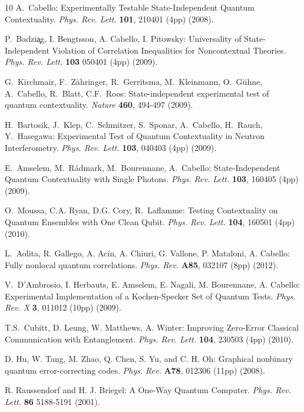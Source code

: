 \begin{thebibliography}{10}
A.~Cabello: Experimentally Testable State-Independent Quantum Contextuality. {\it Phys. Rev. Lett.} \textbf{{\bf 101}}, 210401 (4pp) (2008).

P.~Badzi{\c a}g, I. Bengtsson, A. Cabello, I. Pitowsky: Universality of State-Independent Violation of Correlation Inequalities for Noncontextual Theories. {\it  Phys. Rev. Lett.} {\bf 103} 050401 (4pp) (2009).

G.~Kirchmair, F.~Z{\"a}hringer, R.~Gerritsma, M.~Kleinmann, O.~G{\"u}hne, A.~Cabello, R.~Blatt, C.F.~Roos: State-independent experimental test of quantum contextuality. {\it Nature} \textbf{{\bf 460}}, 494-497 (2009).

H.~Bartosik, J.~Klep, C.~Schmitzer, S.~Sponar, A.~Cabello, H.~Rauch, Y.~Hasegawa: Experimental Test of Quantum Contextuality in Neutron Interferometry. {\it Phys. Rev. Lett.} \textbf{{\bf 103}}, 040403 (4pp) (2009).

E.~Amselem, M.~R{\aa}dmark, M.~Bourennane, A.~Cabello: State-Independent Quantum Contextuality with Single Photons. {\it Phys. Rev. Lett.} \textbf{{\bf 103}}, 160405 (4pp) (2009).

O.~Moussa, C.A. Ryan, D.G. Cory, R.~Laflamme: Testing Contextuality on Quantum Ensembles with One Clean Qubit. {\it Phys. Rev. Lett.} \textbf{{\bf 104}}, 160501 (4pp) (2010).

L.~Aolita, R. Gallego, A. Ac{\'i}n, A. Chiuri, G. Vallone, P. Mataloni, A. Cabello: Fully nonlocal quantum correlations. {\it Phys. Rev.} \textbf{{\bf A85}}, 032107 (8pp) (2012).

V.~D'Ambrosio, I. Herbauts, E. Amselem, E. Nagali, M. Bourennane, A. Cabello: Experimental Implementation of a Kochen-Specker Set of Quantum Tests. {\it  Phys. Rev. X} {\bf 3}, 011012 (10pp) (2009).

T.S.~Cubitt, D. Leung, W. Matthews, A. Winter: Improving Zero-Error Classical Communication with Entanglement. {\it Phys. Rev. Lett.} {\bf 104}, 230503 (4pp) (2010).

D. Hu, W. Tang, M. Zhao, Q. Chen, S. Yu, and C. H. Oh: Graphical nonbinary quantum error-correcting codes. {\it  Phys. Rev.} {\bf A78}, 012306 (11pp) (2008).

R. Raussendorf and H. J. Briegel: A One-Way Quantum Computer. {\it  Phys. Rev. Lett.} {\bf 86} 5188-5191 (2001).


\end{thebibliography}
